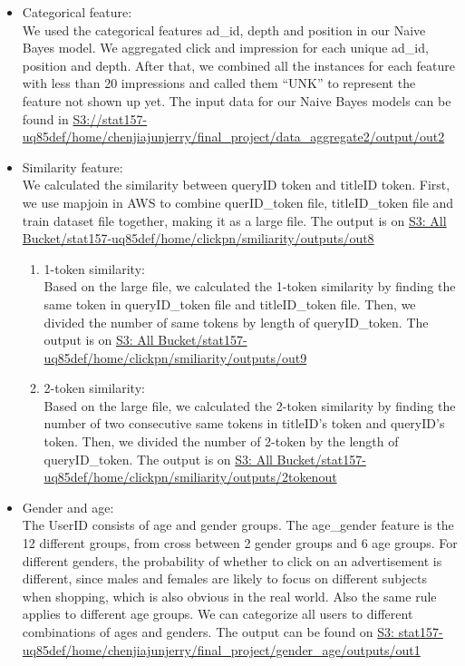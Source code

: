 \documentclass[12pt]{article}
\begin{document}
\begin{itemize}
  \item Categorical feature: \\
We used the categorical features ad\_id, depth and position in our Naive Bayes  model. We aggregated click and impression for each unique ad\_id, position and depth. After that, we combined all the instances for each feature with less than 20 impressions and called them “UNK” to represent the feature not shown up yet. The input data for our Naive Bayes models can be found in \url{S3://stat157-uq85def/home/chenjiajunjerry/final_project/data_aggregate2/output/out2}

\smallskip

  \item Similarity feature:\\
We calculated the similarity between queryID token and titleID token. First, we use mapjoin in AWS  to combine querID\_token file, titleID\_token file and train dataset file together, making it as a large file.
The output is on \url{S3: All Bucket/stat157-uq85def/home/clickpn/smiliarity/outputs/out8
}
\begin{enumerate}
  \item 1-token similarity:\\
Based on the large file, we calculated the 1-token similarity by finding the same token in queryID\_token file and titleID\_token file. Then, we divided the number of same tokens by length of queryID\_token.
The output is on \url{S3: All Bucket/stat157-uq85def/home/clickpn/smiliarity/outputs/out9}
  \item 2-token similarity:\\
Based on the large file, we calculated the 2-token similarity by finding the number of two consecutive same tokens in titleID’s token and queryID’s token. Then, we divided the number of 2-token by the length of queryID\_token.
The output is on \url{S3: All Bucket/stat157-uq85def/home/clickpn/smiliarity/outputs/2tokenout}
\end{enumerate}

\smallskip
  \item Gender and age:\\
The UserID consists of age and gender groups. The age\_gender feature is the 12 different groups, from cross between 2 gender groups and 6 age groups. For different genders, the probability of whether to click on an advertisement is different, since males and females are likely to focus on different subjects when shopping, which is also obvious in the real world. Also the same rule applies to different age groups. We can categorize all users to different combinations of ages and genders. The output can be found on \url{S3:
stat157-uq85def/home/chenjiajunjerry/final_project/gender_age/outputs/out1}
 

\end{itemize}
\end{document}
